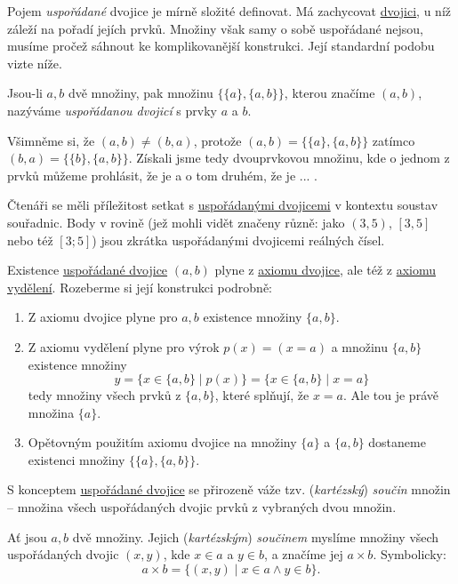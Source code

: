 Pojem \emph{uspořádané} dvojice je mírně složité definovat. Má zachycovat
\hyperref[def:dvojice]{dvojici}, u níž záleží na pořadí jejích prvků. Množiny
však samy o sobě uspořádané nejsou, musíme pročež sáhnout ke komplikovanější
konstrukci. Její standardní podobu vizte níže.
\begin{definition}
  \label{def:usporadana-dvojice}
  Jsou-li $a, b$ dvě množiny, pak množinu $\{\{a\}, \{a, b\}\}$, kterou značíme
  $(a, b)$, nazýváme \emph{uspořádanou dvojicí} s prvky $a$ a $b$.
\end{definition}
Všimněme si, že $(a, b) \neq (b, a)$, protože $(a, b) = \{\{a\}, \{a, b\}\}$
zatímco $(b, a) = \{\{b\}, \{a, b\}\}$. Získali jsme tedy dvouprvkovou množinu,
kde o jednom z prvků můžeme prohlásit, že je  a o tom druhém, že je
... .
\begin{example}
  \label{exam:usporadana-dvojice}
  Čtenáři se měli příležitost setkat s
  \hyperref[def:usporadana-dvojice]{uspořádanými dvojicemi} v kontextu soustav
  souřadnic. Body v rovině (jež mohli vidět značeny různě: jako $(3, 5)$, $[3,
  5]$ nebo též $[3; 5]$) jsou zkrátka uspořádanými dvojicemi reálných čísel.
\end{example}
\begin{remark}
  Existence \hyperref[def:usporadana-dvojice]{uspořádané dvojice} $(a, b)$ plyne
  z \hyperref[eq:axiom-dvojice]{axiomu dvojice}, ale též z
  \hyperref[eq:axiom-vydeleni]{axiomu vydělení}. Rozeberme si její konstrukci
  podrobně:
  \begin{enumerate}
    \item Z axiomu dvojice plyne pro $a, b$ existence množiny $\{a, b\}$.
    \item Z axiomu vydělení plyne pro výrok $p(x) = (x = a)$ a množinu $\{a,
      b\}$ existence množiny
      \[
        y = \{x \in \{a, b\} \mid p(x)\} = \{x \in \{a, b\} \mid x = a\}
      \]
      tedy množiny všech prvků z $\{a, b\}$, které splňují, že $x = a$. Ale tou
      je právě množina $\{a\}$.
    \item Opětovným použitím axiomu dvojice na množiny $\{a\}$ a $\{a, b\}$
      dostaneme existenci množiny $\{\{a\}, \{a, b\}\}$.
  \end{enumerate}
\end{remark}
S konceptem \hyperref[def:usporadana-dvojice]{uspořádané dvojice} se přirozeně
váže tzv. (\emph{kartézský}) \emph{součin} množin -- množina všech uspořádaných
dvojic prvků z vybraných dvou množin.
\begin{definition}
  \label{def:soucin-mnozin}
  Ať jsou $a, b$ dvě množiny. Jejich (\emph{kartézským}) \emph{součinem} myslíme
  množiny všech uspořádaných dvojic $(x, y)$, kde $x \in a$ a $y \in b$, a
  značíme jej $a \times b$. Symbolicky:
  \begin{equation}
    \label{eq:soucin-mnozin}
    a \times b = \{(x, y) \mid x \in a \wedge y \in b\}.
  \end{equation}
\end{definition}
